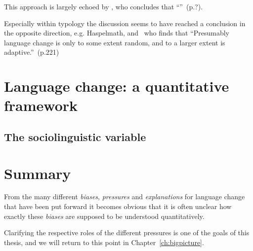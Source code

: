 This approach is largely echoed by \citet{Croft200?}, who concludes that ``''~(p.?).

Especially within typology the discussion seems to have reached a conclusion in the opposite direction, e.g. Haspelmath, and~\citet{Wichmann2015} who finds that ``Presumably language change is only to some extent random, and to a larger extent is adaptive.''~(p.221)

\section{Language change: a quantitative framework}

\subsection{The sociolinguistic variable}



\section{Summary}

From the many different \emph{biases}, \emph{pressures} and \emph{explanations} for language change that have been put forward it becomes obvious that it is often unclear how exactly these \emph{biases} are supposed to be understood quantitatively.

Clarifying the respective roles of the different pressures is one of the goals of this thesis, and we will return to this point in Chapter~\ref{ch:bigpicture}.
